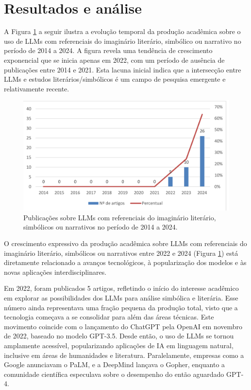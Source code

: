 \documentclass[portuguese]{textolivre}
\begin{document}
\section{Resultados e análise}

A Figura \ref{fig-1} a seguir ilustra a evolução temporal da produção acadêmica sobre o uso de LLMs com referenciais do imaginário literário, simbólico ou narrativo no período de 2014 a 2024. A figura revela uma tendência de crescimento exponencial que se inicia apenas em 2022, com um período de ausência de publicações entre 2014 e 2021. Esta lacuna inicial indica que a intersecção entre LLMs e estudos literários/simbólicos é um campo de pesquisa emergente e relativamente recente.

\begin{figure}[htbp]
\centering
\begin{minipage}{0.65\textwidth}
\includegraphics[width=\textwidth]{Imagens/fig-001.png}
\caption{Publicações sobre LLMs com referenciais do imaginário literário, simbólicos ou narrativos no período de 2014 a 2024.}
\label{fig-1}
\end{minipage}
\end{figure}

O crescimento expressivo da produção acadêmica sobre LLMs com referenciais do imaginário literário, simbólicos ou narrativos entre 2022 e 2024 (Figura \ref{fig-1}) está diretamente relacionado a avanços tecnológicos, à popularização dos modelos e às novas aplicações interdisciplinares.

Em 2022, foram publicados 5 artigos, refletindo o início do interesse acadêmico em explorar as possibilidades dos LLMs para análise simbólica e literária. Esse número ainda representava uma fração pequena da produção total, visto que a tecnologia começava a se consolidar para além das áreas técnicas. Este movimento coincide com o lançamento do ChatGPT pela OpenAI em novembro de 2022, baseado no modelo GPT-3.5. Desde então, o uso de LLMs se tornou amplamente acessível, popularizando aplicações de IA em linguagem natural, inclusive em áreas de humanidades e literatura. Paralelamente, empresas como a Google anunciavam o PaLM, e a DeepMind lançava o Gopher, enquanto a comunidade científica especulava sobre o desempenho do então aguardado GPT-4.
\end{document}
